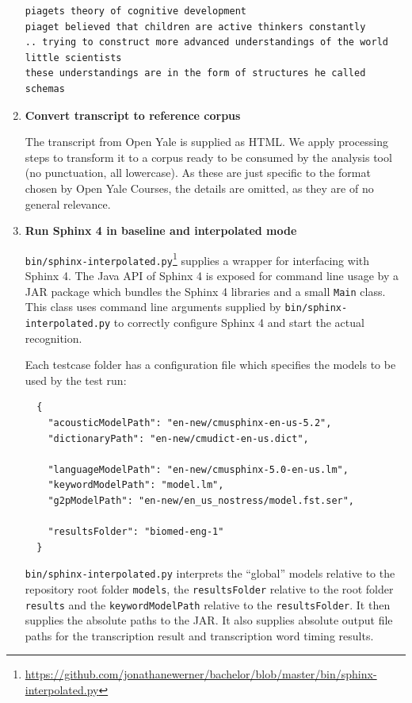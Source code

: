 \documentclass[]{article}
\begin{document}
\begin{enumerate}
\begin{verbatim}
piagets theory of cognitive development
piaget believed that children are active thinkers constantly
.. trying to construct more advanced understandings of the world
little scientists
these understandings are in the form of structures he called schemas
\end{verbatim}
\item
  \textbf{Convert transcript to reference corpus}

  The transcript from Open Yale is supplied as HTML. We apply processing
  steps to transform it to a corpus ready to be consumed by the analysis
  tool (no punctuation, all lowercase). As these are just specific to
  the format chosen by Open Yale Courses, the details are omitted, as
  they are of no general relevance.
\item
  \textbf{Run Sphinx 4 in baseline and interpolated mode}

  \texttt{bin/sphinx-interpolated.py}\footnote{\url{https://github.com/jonathanewerner/bachelor/blob/master/bin/sphinx-interpolated.py}}
  supplies a wrapper for interfacing with Sphinx 4. The Java API of
  Sphinx 4 is exposed for command line usage by a JAR package which
  bundles the Sphinx 4 libraries and a small \texttt{Main} class. This
  class uses command line arguments supplied by
  \texttt{bin/sphinx-interpolated.py} to correctly configure Sphinx 4
  and start the actual recognition.

  Each testcase folder has a configuration file which specifies the
  models to be used by the test run:

\begin{verbatim}
  {
    "acousticModelPath": "en-new/cmusphinx-en-us-5.2",
    "dictionaryPath": "en-new/cmudict-en-us.dict",

    "languageModelPath": "en-new/cmusphinx-5.0-en-us.lm",
    "keywordModelPath": "model.lm",
    "g2pModelPath": "en-new/en_us_nostress/model.fst.ser",

    "resultsFolder": "biomed-eng-1"
  }
\end{verbatim}

  \texttt{bin/sphinx-interpolated.py} interprets the ``global'' models
  relative to the repository root folder \texttt{models}, the
  \texttt{resultsFolder} relative to the root folder \texttt{results}
  and the \texttt{keywordModelPath} relative to the
  \texttt{resultsFolder}. It then supplies the absolute paths to the
  JAR. It also supplies absolute output file paths for the transcription
  result and transcription word timing results.


\end{enumerate}
\end{document}
